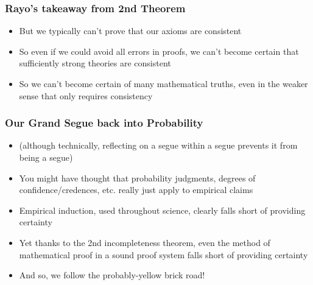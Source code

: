 \begin{frame}
\frametitle{Rayo's takeaway from 2nd Theorem}

\begin{itemize}[<+->]

\item But we typically can't prove that our axioms are consistent

\item So even if we could avoid all errors in proofs, we can't become certain that sufficiently strong theories are consistent

\item So we can't become certain of many mathematical truths, even in the weaker sense that only requires consistency


\end{itemize}
\end{frame}

\begin{frame}
\frametitle{Our Grand Segue back into Probability}

\begin{itemize}[<+->]

\item (although technically, reflecting on a segue within a segue prevents it from being a segue)

\item You might have thought that probability judgments, degrees of confidence/credences, etc. really just apply to empirical claims

\item Empirical induction, used throughout science, clearly falls short of providing certainty

\item Yet thanks to the 2nd incompleteness theorem, even the method of mathematical proof in a sound proof system falls short of providing certainty

\item And so, we follow the probably-yellow brick road!



\end{itemize}
\end{frame}


